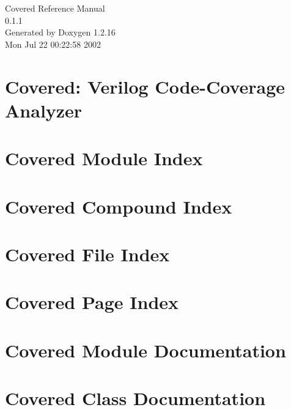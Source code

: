 \documentclass[a4paper]{book}
\begin{document}
\begin{titlepage}
\vspace*{7cm}
\begin{center}
{\Large Covered Reference Manual\\[1ex]\large 0.1.1}\\
\vspace*{1cm}
{\large Generated by Doxygen 1.2.16}\\
\vspace*{0.5cm}
{\small Mon Jul 22 00:22:58 2002}\\
\end{center}
\end{titlepage}
\clearemptydoublepage
{}
\tableofcontents
\clearemptydoublepage
{}
\chapter{Covered: Verilog Code-Coverage Analyzer}
\label{index}
\chapter{Covered Module Index}

\chapter{Covered Compound Index}

\chapter{Covered File Index}

\chapter{Covered Page Index}

\chapter{Covered Module Documentation}










\chapter{Covered Class Documentation}



























\end{document}
